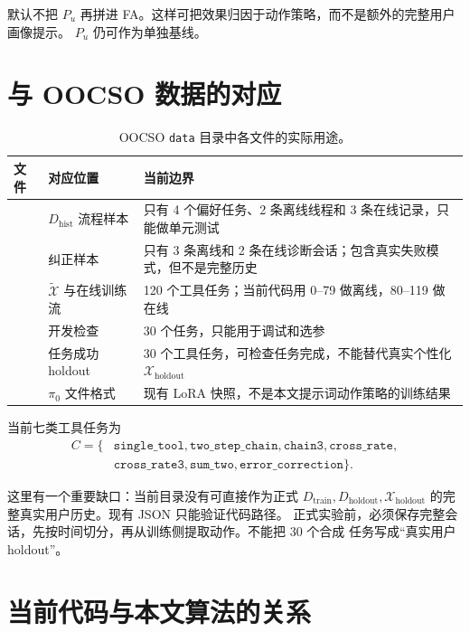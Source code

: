 \documentclass[11pt,UTF8,fontset=fandol]{ctexart}
\newcommand{\Dhist}{D_{\mathrm{hist}}}
\newcommand{\Dtrain}{D_{\mathrm{train}}}
\newcommand{\Dholdout}{D_{\mathrm{holdout}}}
\newcommand{\Xholdout}{\mathcal X_{\mathrm{holdout}}}
\newcommand{\Xsim}{\widetilde{\mathcal X}}
\begin{document}
默认不把 \(P_u\) 再拼进 FA。这样可把效果归因于动作策略，而不是额外的完整用户画像提示。
\(P_u\) 仍可作为单独基线。

\section{与 OOCSO 数据的对应}

\begin{table}[ht]
  \centering
  \caption{OOCSO \texttt{data} 目录中各文件的实际用途。}
  \begin{tabularx}{\textwidth}{@{}L{0.28\textwidth}L{0.20\textwidth}Y@{}}
    \toprule
    文件 & 对应位置 & 当前边界 \\
    \midrule
     &
    \(\Dhist\) 流程样本 &
    只有 4 个偏好任务、2 条离线线程和 3 条在线记录，只能做单元测试 \\
     &
    纠正样本 &
    只有 3 条离线和 2 条在线诊断会话；包含真实失败模式，但不是完整历史 \\
     &
    \(\Xsim\) 与在线训练流 &
    120 个工具任务；当前代码用 0--79 做离线，80--119 做在线 \\
     &
    开发检查 &
    30 个任务，只能用于调试和选参 \\
     &
    任务成功 holdout &
    30 个工具任务，可检查任务完成，不能替代真实个性化 \(\Xholdout\) \\
     &
    \(\pi_0\) 文件格式 &
    现有 LoRA 快照，不是本文提示词动作策略的训练结果 \\
    \bottomrule
  \end{tabularx}
\end{table}

当前七类工具任务为
\[
  \begin{aligned}
  C=\{&
  \texttt{single\_tool},\texttt{two\_step\_chain},
  \texttt{chain3},\texttt{cross\_rate},\\
  &\texttt{cross\_rate3},\texttt{sum\_two},
  \texttt{error\_correction}\}.
  \end{aligned}
\]

这里有一个重要缺口：当前目录没有可直接作为正式
\(\Dtrain,\Dholdout,\Xholdout\) 的完整真实用户历史。现有 JSON 只能验证代码路径。
正式实验前，必须保存完整会话，先按时间切分，再从训练侧提取动作。不能把 30 个合成
 任务写成``真实用户 holdout''。

\section{当前代码与本文算法的关系}
\end{document}
